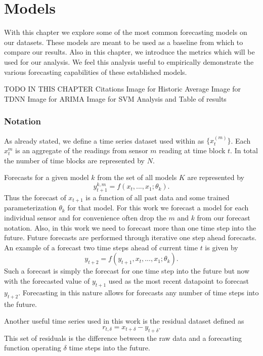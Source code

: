 \chapter{Models}
With this chapter we explore some of the most common forecasting models on our datasets.  These models are meant to be used as a baseline from which to compare our results. Also in this chapter, we introduce the metrics which will be used for our analysis.  We feel this analysis useful to empirically demonstrate the various forecasting capabilities of these established models.

TODO IN THIS CHAPTER
Citations
Image for Historic Average
Image for TDNN
Image for ARIMA
Image for SVM
Analysis and Table of results


\subsection{Notation}
As already stated, we define a time series dataset used within as  $\{x_{t}^{(m)}\}$.  Each $x_{t}^{m}$ is an aggregate of the readings from sensor $m$ reading at time block $t$.  In total the number of time blocks are represented by $N$.

Forecasts for a given model $k$ from the set of all models $K$ are represented by 
\begin{equation}
y_{t + 1}^{k, m} = f(x_{t}, ..., x_{1}; \theta_{k}).
\end{equation}
\noindent
Thus the forecast of $x_{t + 1}$ is a function of all past data and some trained parameterization $\theta_{k}$ for that model.  For this work we forecast a model for each individual sensor and for convenience often drop the $m$ and $k$ from our forecast notation.  Also, in this work we need to forecast more than one time step into the future.  Future forecasts are performed through iterative one step ahead forecasts.    An example of a forecast two time steps ahead of current time $t$ is given by 
\begin{equation}
y_{t + 2} = f(y_{t + 1}, x_{t}, ..., x_{1}; \theta_{k}).
\end{equation}
\noindent
Such a forecast is simply the forecast for one time step into the future but now with the forecasted value of $y_{t + 1}$ used as the most recent datapoint to forecast $y_{t + 2}$.  Forecasting in this nature allows for forecasts any number of time steps into the future.

Another useful time series used in this work is the residual dataset defined as
\begin{equation}
r_{t,\delta} =  x_{t + \delta} - y_{t + \delta}.
\end{equation}
This set of residuals is the difference between the raw data and a forecasting function operating $\delta$ time steps into the future. 


